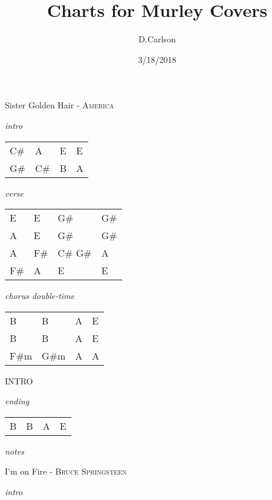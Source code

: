 \documentclass[12pt]{article}
\begin{document}
\title{\bf Charts for Murley Covers}
\author{D.Carlson}
\date{3/18/2018}
\renewcommand{\familydefault}{\sfdefault}
\renewcommand{\seriesdefault}{\bfdefault}



{\Huge Sister Golden Hair} {\huge - \textsc{America}}

\huge
\textit{intro}

\begin{tabular}{|P{1.25in}|P{1.25in}|P{1.25in}|P{1.25in}|}
  C\# & A & E & E \\
  G\# & C\# & B & A \\
\end{tabular}

\textit{verse}

\begin{tabular}{|P{1.25in}|P{1.25in}|P{1.25in}|P{1.25in}|}
  E & E & G\# & G\# \\
  A & E & G\# & G\#  \\
  A & F\# & C\# G\# & A \\
  F\# & A & E & E \\
\end{tabular}

\textit{chorus \normalsize double-time}

\begin{tabular}{|P{1.25in}|P{1.25in}|P{1.25in}|P{1.25in}|}
  B     &   B     &  A  &  E   \\
  B     &   B     &  A  &  E   \\
  F\#m  &   G\#m  &  A  &  A   \\
\end{tabular}

{\huge INTRO}

\textit{ending}

\begin{tabular}{|P{1.25in}|P{1.25in}|P{1.25in}|P{1.25in}|}
  B     &  B      &   A    &  E    \\
\end{tabular}

\textit{notes}


\newpage

{\Huge I'm on Fire} {\huge - \textsc{Bruce Springsteen}}

\huge
\textit{intro}
\end{document}
